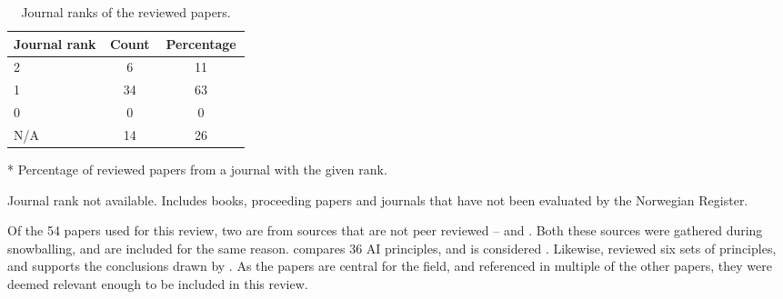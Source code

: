 \begin{table}[htpb]
    \centering
    \caption{Journal ranks of the reviewed papers.}
    \label{tab:summary-ranks}
    \begin{threeparttable}
    \begin{tabular}{p{0.4\linewidth}cc}
    \toprule
        \textbf{Journal rank} & \textbf{Count} & \textbf{Percentage}\tnote{*} \\
    \midrule
        2                       & 6     & 11    \\
        1                       & 34    & 63    \\
        0                       & 0     & 0     \\
        N/A\tnote{\textdagger}  & 14    & 26    \\
    \bottomrule
    \end{tabular}
    \begin{tablenotes}
        \footnotesize
        \item [*] Percentage of reviewed papers from a journal with the given rank.
        \item [\textdagger] Journal rank not available. Includes books, proceeding papers and journals that have not been evaluated by the Norwegian Register.
    \end{tablenotes}
\end{threeparttable}
\end{table}

Of the 54 papers used for this review, two are from sources that are not peer reviewed -- \textcite{Fjeld_2020} and \textcite{Floridi_2019}. Both these sources were gathered during snowballing, and are included for the same reason. \textcite{Fjeld_2020} compares 36 AI principles, and is considered  \parencite[p. 2]{Bélisle-Pipon_2022}. Likewise, \textcite{Floridi_2019} reviewed six sets of principles, and supports the conclusions drawn by \textcite{Floridi_2018}. As the papers are central for the field, and referenced in multiple of the other papers, they were deemed relevant enough to be included in this review.

